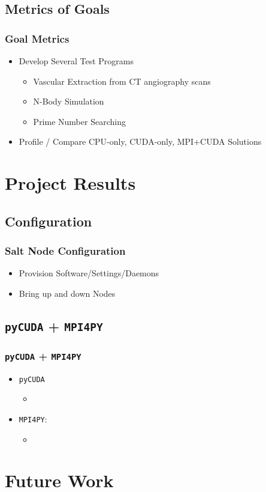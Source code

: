 \documentclass{beamer}
\begin{document}
\subsection{Metrics of Goals}
\begin{frame}
\frametitle{Goal Metrics}
\begin{itemize}
\item{Develop Several Test Programs}
\begin{itemize}
\item{Vascular Extraction from CT angiography scans}
\item{N-Body Simulation}
\item{Prime Number Searching}
\end{itemize}
\item{Profile / Compare CPU-only, CUDA-only, MPI+CUDA Solutions}
\end{itemize}
\end{frame}
\section{Project Results}
\subsection{Configuration}
\begin{frame}
\frametitle{Salt Node Configuration}
\begin{itemize}
\item{Provision Software/Settings/Daemons}
\item{Bring up and down Nodes}
\end{itemize}
\end{frame}
\subsection{\texttt{pyCUDA} + \texttt{MPI4PY}}
\begin{frame}
\frametitle{\texttt{pyCUDA} + \texttt{MPI4PY}}
\begin{itemize}
\item{\texttt{pyCUDA}}
\begin{itemize}
\item{}
\end{itemize}
\item{\texttt{MPI4PY}:}
\begin{itemize}
\item{}
\end{itemize}
\end{itemize}
\end{frame}
\section{Future Work}
\end{document}
